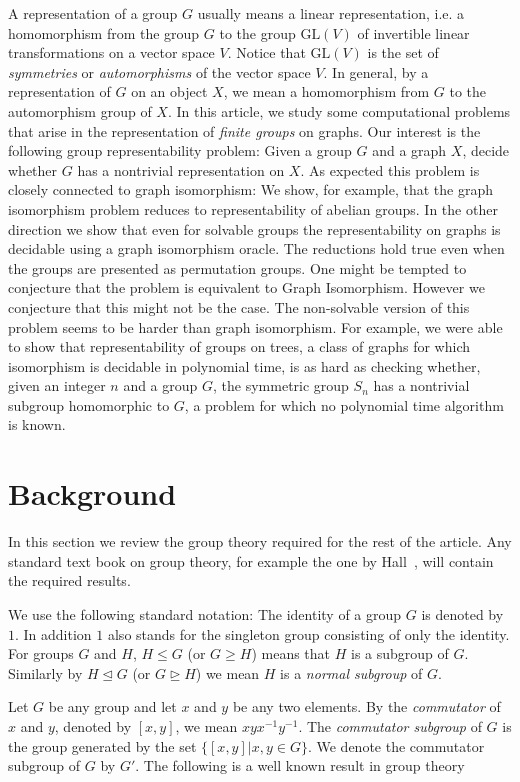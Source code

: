 \documentclass[a4paper,11pt]{article}
\newcommand{\GL}[1]{\ensuremath{\mathrm{GL}\left(#1\right)}}
\begin{document}
A representation of a group $G$ usually means a linear representation,
i.e. a homomorphism from the group $G$ to the group $\GL{V}$ of
invertible linear transformations on a vector space $V$.  Notice that
$\GL{V}$ is the set of \emph{symmetries} or \emph{automorphisms} of
the vector space $V$. In general, by a representation of $G$ on an
object $X$, we mean a homomorphism from $G$ to the automorphism group
of $X$.  In this article, we study some computational problems that
arise in the representation of \emph{finite groups} on graphs. Our
interest is the following group representability problem: Given a
group $G$ and a graph $X$, decide whether $G$ has a nontrivial
representation on $X$. As expected this problem is closely connected
to graph isomorphism: We show, for example, that the graph isomorphism
problem reduces to representability of abelian groups. In the other
direction we show that even for solvable groups the representability
on graphs is decidable using a graph isomorphism oracle. The
reductions hold true even when the groups are presented as permutation
groups. One might be tempted to conjecture that the problem is
equivalent to Graph Isomorphism. However we conjecture that this might
not be the case. The non-solvable version of this problem seems to be
harder than graph isomorphism. For example, we were able to show that
representability of groups on trees, a class of graphs for which
isomorphism is decidable in polynomial time, is as hard as checking
whether, given an integer $n$ and a group $G$, the symmetric group
$S_n$ has a nontrivial subgroup homomorphic to $G$, a problem for
which no polynomial time algorithm is known.

\section{Background}

In this section we review the group theory required for the rest of
the article. Any standard text book on group theory, for example the
one by Hall~\cite{hall}, will contain the required results.

We use the following standard notation: The identity of a group $G$ is
denoted by $1$. In addition $1$ also stands for the singleton group
consisting of only the identity. For groups $G$ and $H$, $H \leq G$
(or $G\geq H$) means that $H$ is a subgroup of $G$. Similarly by $H
\unlhd G$ (or $G\unrhd H$) we mean $H$ is a \emph{normal subgroup} of
$G$.

Let $G$ be any group and let $x$ and $y$ be any two elements. By the
\emph{commutator} of $x$ and $y$, denoted by $[x,y]$, we mean
$xyx^{-1}y^{-1}$. The \emph{commutator subgroup} of $G$ is the group
generated by the set $\{[x,y]|x,y \in G\}$. We denote the commutator
subgroup of $G$ by $G'$. The following is a well known result in group
theory~\cite[Theorem 9.2.1]{hall}
\end{document}
